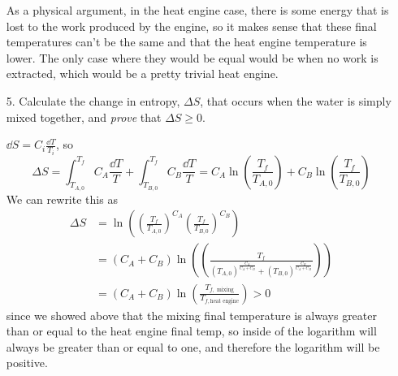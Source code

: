\documentclass[a4paper,twoside]{article}
\begin{document}
\begin{itemize}
\begin{problem}
            As a physical argument, in the heat engine case, there is some energy that is lost to the work produced by the engine, so it makes sense that these final temperatures can't be the same and that the heat engine temperature is lower. The only case where they would be equal would be when no work is extracted, which would be a pretty trivial heat engine.
        \end{problem}
    \item[5.] Calculate the change in entropy, $ \Delta S $, that occurs when the water is simply mixed together, and \textit{prove} that $ \Delta S \geq 0 $.
        \begin{problem}
            $ \dd{S} = C_i \frac{\dd{T}}{T_i} $, so
            \begin{equation}
                \Delta S = \int_{T_{A,0}}^{T_f} C_A \frac{\dd{T}}{T} + \int_{T_{B,0}}^{T_f} C_B \frac{\dd{T}}{T} = C_A \ln(\frac{T_f}{T_{A,0}}) + C_B \ln(\frac{T_f}{T_{B,0}})
            \end{equation}
            We can rewrite this as
            \begin{align}
                \Delta S &= \ln( \left( \frac{T_f}{T_{A,0}} \right)^{C_A} \left(\frac{T_f}{T_{B,0}}\right)^{C_B} ) \\
                &= (C_A + C_B) \ln( \left( \frac{T_f}{(T_{A,0})^{\frac{C_A}{C_A + C_B}} + (T_{B,0})^{\frac{C_B}{C_A + C_B}}} \right)) \\
                &= (C_A + C_B)\ln( \frac{T_{f,\text{ mixing}}}{T_{f, \text{heat engine}}}) > 0
            \end{align}
            since we showed above that the mixing final temperature is always greater than or equal to the heat engine final temp, so inside of the logarithm will always be greater than or equal to one, and therefore the logarithm will be positive.
        \end{problem}
\end{itemize}
\end{document}
